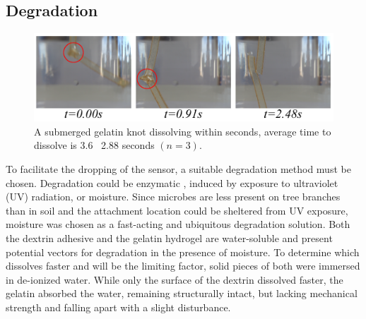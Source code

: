 \subsection{Degradation}

\begin{figure}[!t]
\centering
\includegraphics[width=1\columnwidth]{figures/figure5-gelatin-degrade/figure5-gelatin-degrade.pdf}
\caption{A submerged gelatin knot dissolving within seconds, average time to dissolve is 3.6 \textpm~2.88 seconds $(n=3)$.}
\label{fig5_gelatin_degrade}
\end{figure}
To facilitate the dropping of the sensor, a suitable degradation method must be chosen. Degradation could be enzymatic \cite{Arshad2014}, induced by exposure to ultraviolet (UV) radiation, or moisture. Since microbes are less present on tree branches than in soil and the attachment location could be sheltered from UV exposure, moisture was chosen as a fast-acting and ubiquitous degradation solution.
Both the dextrin adhesive and the gelatin hydrogel are water-soluble and present potential vectors for degradation in the presence of moisture. To determine which dissolves faster and will be the limiting factor, solid pieces of both were immersed in de-ionized water. While only the surface of the dextrin dissolved faster, the gelatin absorbed the water, remaining structurally intact, but lacking mechanical strength and falling apart with a slight disturbance. 

